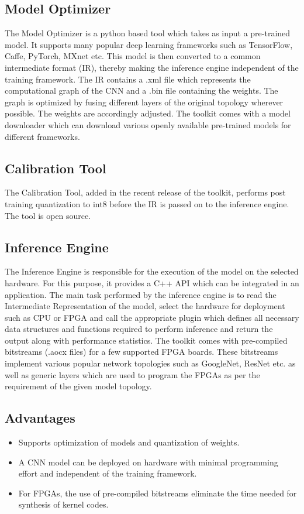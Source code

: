 \documentclass[titlepage]{report}
\begin{document}
\begin{itemize}
\subsection{Model Optimizer}
The Model Optimizer is a python based tool which takes as input a pre-trained model. It supports many popular deep learning frameworks such as TensorFlow, Caffe, PyTorch, MXnet etc. This model is then converted to a common intermediate format (IR), thereby making the inference engine independent of the training framework. The IR contains a .xml file which represents the computational graph of the CNN and a .bin file containing the weights. The graph is optimized by fusing different layers of the original topology wherever possible. The weights are accordingly adjusted. The toolkit comes with a model downloader which can download various openly available pre-trained models for different frameworks.
 
\subsection{Calibration Tool}
 The Calibration Tool, added in the recent release of the toolkit, performs post training quantization to int8 before the IR is passed on to the inference engine.  The tool is open source. 
 
 \subsection{Inference Engine}
 The Inference Engine is responsible for the execution of the model on the selected hardware. For this purpose, it provides a C++ API which can be integrated in an application. The main task performed by the inference engine is to read the Intermediate Representation of the model, select the hardware for deployment such as CPU or FPGA and call the appropriate plugin which defines all necessary data structures and functions required to perform inference and return the output along with performance statistics. 
 The toolkit comes with pre-compiled bitstreams (.aocx files) for a few supported FPGA boards. These bitstreams implement various popular network topologies such as GoogleNet, ResNet etc. as well as generic layers which are used to program the FPGAs as per the requirement of the given model topology. 
 \subsection{Advantages}
  
 \begin{itemize}
 \item Supports optimization of models and quantization of weights.
 \item A CNN model can be deployed on hardware with minimal programming effort and independent of the training framework.
 \item For FPGAs, the use of pre-compiled bitstreams eliminate the time needed for synthesis of kernel codes.
 \end{itemize}
 

\end{itemize}
\end{document}
